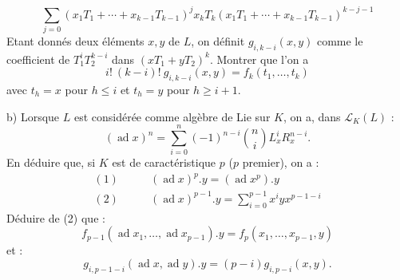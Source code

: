 \[
\sum_{j=0}(x_1T_1+\cdots+x_{k-1}T_{k-1})^j x_kT_k
(x_1T_1+\cdots+x_{k-1}T_{k-1})^{k-j-1}
\]
Etant donnés deux éléments $x,y$ de $L$, on définit $g_{i,k-i}(x,y)$ comme
le coefficient de $T_1^iT_2^{k-i}$ dans $(xT_1+yT_2)^k$.
Montrer que l'on a
\[
i!\ (k-i)!\ g_{i,k-i}(x,y)=f_k(t_1,\ldots,t_k)
\]
avec $t_h=x$ pour $h\leq i$ et $t_h=y$ pour $h\geq i+1$.

b) Lorsque $L$ est considérée comme algèbre de Lie sur $K$, on a, dans
$\mathcal L_K(L)$ :
\[
(\operatorname{ad}x)^n=\sum_{i=0}^n(-1)^{n-i}\binom ni L_x^i R_x^{n-i}.
\]
En déduire que, si $K$ est de caractéristique $p$ ($p$ premier), on a :
\[
\begin{aligned}
(1)\qquad &(\operatorname{ad}x)^p.y=(\operatorname{ad}x^p).y\\
(2)\qquad &(\operatorname{ad}x)^{p-1}.y=\sum_{i=0}^{p-1}x^iyx^{p-1-i}
\end{aligned}
\]
Déduire de (2) que :
\[
f_{p-1}(\operatorname{ad}x_1,\ldots,\operatorname{ad}x_{p-1}).y
=f_p(x_1,\ldots,x_{p-1},y)
\]
et :
\[
g_{i,p-1-i}(\operatorname{ad}x,\operatorname{ad}y).y
=(p-i)g_{i,p-i}(x,y).
\]
